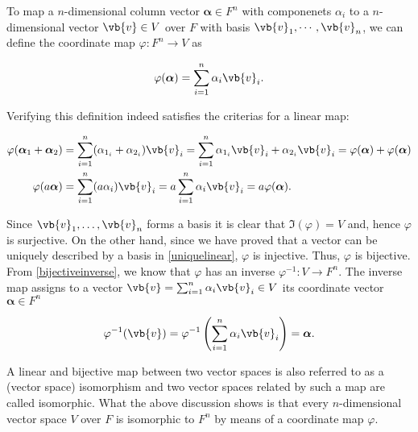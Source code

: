 \documentclass[a4paper,12pt]{report}
\begin{document}
To map a \(n\)-dimensional column vector \(\boldsymbol{\alpha } \in F^{n} \) with componenets \(\alpha _{i} \)  to a \(n\)-dimensional vector \(\vb{v} \in V\) over \(F\) with basis \(\vb{v}_1, \cdots, \vb{v}_n \), we can define the coordinate map \(\varphi : F^{n} \rightarrow V \) as      

\begin{equation}
    \varphi (\boldsymbol{\alpha } ) = \sum_{i=1}^{n} \alpha _{i} \vb{v} _{i} . 
\end{equation}

Verifying this definition indeed satisfies the criterias for a linear map:

\begin{equation}
    \begin{aligned}
    \varphi (\boldsymbol{\alpha }_{1}  + \boldsymbol{\alpha }_{2}   )  &= \sum_{i=1}^{n} (\alpha _{1_i} + \alpha  _{2_i}   )\vb{v} _{i} = \sum_{i=1}^{n} \alpha _{1_i} \vb{v} _{i}  + \alpha  _{2_i} \vb{v} _{i} = \varphi (\boldsymbol{\alpha } ) + \varphi (\boldsymbol{\alpha } )   \\
    \varphi (a \boldsymbol{\alpha } ) &= \sum_{i=1}^{n} (a \alpha _{i} ) \vb{v} _{i} = a \sum_{i=1}^{n} \alpha _{i} \vb{v} _{i} = a \varphi (\boldsymbol{\alpha } ). 
    \end{aligned}
\end{equation}

Since \(\vb{v}_{1}, \ldots, \vb{v}_n \) forms a basis it is clear that \(\Im (\varphi ) = V\) and, hence \(\varphi \) is surjective. On the other hand, since we have proved that a vector can be uniquely described by a basis in \cref{uniquelinear}, \(\varphi \) is injective. Thus, \(\varphi \) is bijective. From \cref{bijectiveinverse}, we know that \(\varphi \) has an inverse \(\varphi ^{-1} : V \rightarrow F^{n} \). The inverse map assigns to a vector \(\vb{v} = \sum_{i=1}^{n} \alpha _{i} \vb{v} _{i} \in V\) its coordinate vector \(\boldsymbol{\alpha } \in F^{n}  \)

\begin{equation}
    \varphi ^{-1} (\vb{v} ) = \varphi ^{-1} \left( \sum_{i=1}^{n} \alpha _{i} \vb{v} _{i}  \right) = \boldsymbol{\alpha }. 
\end{equation}

A linear and bijective map between two vector spaces is also referred to as a (vector space) isomorphism and two vector spaces related by such a map are called isomorphic. What the above discussion shows is that every \(n\)-dimensional vector space \(V\) over \(F\) is isomorphic to \(F^{n} \) by means of a coordinate map \(\varphi \). 
\end{document}
